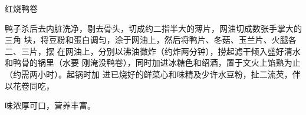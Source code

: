 %
%
%
%
%
%
%
\begin{recipe}{红烧鸭卷}

\ingredients


\preparation

鸭子杀后去内脏洗净，剔去骨头，切成约二指半大的薄片，网油切成数张手掌大的三角
块，将豆粉和蛋白调匀，涂于网油上，然后将鸭片、冬菇、玉兰片、火腿各二、三片，摆
在网油上，分别以沸油微炸（约炸两分钟），捞起滤干倾入盛好清水和鸭骨的锅里（水要
刚淹没鸭卷），同时加进冰糖色和绍酒，置于文火上馅熟为止（约需两小时）。起锅时加
进已烧好的鲜菜心和味精及少许水豆粉，扯二流芡，伴以花卷同吃，

\features

味浓厚可口，营养丰富。

\end{recipe}

